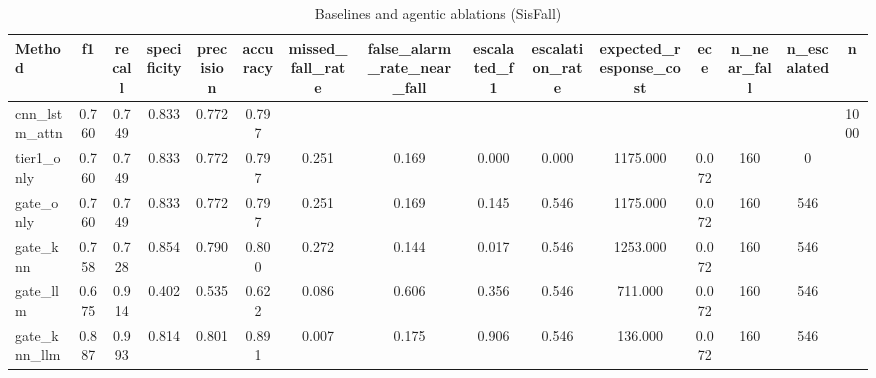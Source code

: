 \begin{table}[t]
\centering
\caption{Baselines and agentic ablations (SisFall)}
\begin{tabular}{lcccccccccccccc}
\toprule
Method & f1 & recall & specificity & precision & accuracy & missed_fall_rate & false_alarm_rate_near_fall & escalated_f1 & escalation_rate & expected_response_cost & ece & n_near_fall & n_escalated & n \\
\midrule
cnn_lstm_attn & 0.760 & 0.749 & 0.833 & 0.772 & 0.797 &  &  &  &  &  &  &  &  & 1000 \\
tier1_only & 0.760 & 0.749 & 0.833 & 0.772 & 0.797 & 0.251 & 0.169 & 0.000 & 0.000 & 1175.000 & 0.072 & 160 & 0 &  \\
gate_only & 0.760 & 0.749 & 0.833 & 0.772 & 0.797 & 0.251 & 0.169 & 0.145 & 0.546 & 1175.000 & 0.072 & 160 & 546 &  \\
gate_knn & 0.758 & 0.728 & 0.854 & 0.790 & 0.800 & 0.272 & 0.144 & 0.017 & 0.546 & 1253.000 & 0.072 & 160 & 546 &  \\
gate_llm & 0.675 & 0.914 & 0.402 & 0.535 & 0.622 & 0.086 & 0.606 & 0.356 & 0.546 & 711.000 & 0.072 & 160 & 546 &  \\
gate_knn_llm & 0.887 & 0.993 & 0.814 & 0.801 & 0.891 & 0.007 & 0.175 & 0.906 & 0.546 & 136.000 & 0.072 & 160 & 546 &  \\
\bottomrule
\end{tabular}
\end{table}